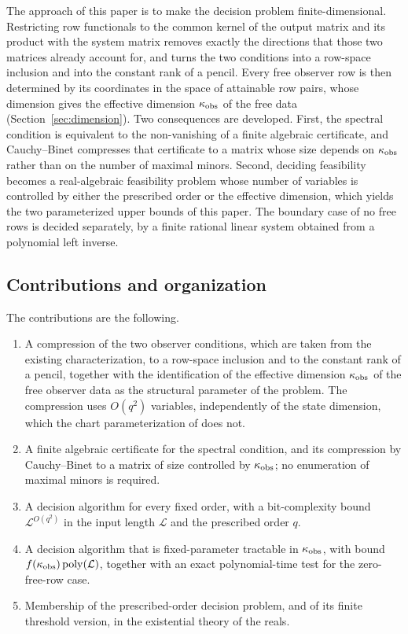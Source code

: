 \documentclass[journal]{IEEEtran}
\theoremstyle{plainn}
\theoremstyle{remark}
\begin{document}
The approach of this paper is to make the decision problem finite-dimensional. Restricting
row functionals to the common kernel of the output matrix and its product with the system
matrix removes exactly the directions that those two matrices already account for, and
turns the two conditions into a row-space inclusion and into the constant rank of a
pencil. Every free observer row is then determined by its coordinates in the space of
attainable row pairs, whose dimension gives the effective dimension $\kappa_{\rm obs}$ of
the free data (Section~\ref{sec:dimension}). Two consequences are developed. First, the
spectral condition is equivalent to the non-vanishing of a finite algebraic certificate,
and Cauchy--Binet compresses that certificate to a matrix whose size depends on
$\kappa_{\rm obs}$ rather than on the number of maximal minors. Second, deciding
feasibility becomes a real-algebraic feasibility problem whose number of variables is
controlled by either the prescribed order or the effective dimension, which yields the two
parameterized upper bounds of this paper. The boundary case of no free rows is decided
separately, by a finite rational linear system obtained from a polynomial left inverse.

\subsection{Contributions and organization}\label{sec:contrib}

The contributions are the following.

\begin{enumerate}
\item A compression of the two observer conditions, which are taken from the existing
characterization, to a row-space inclusion and to the constant rank of a pencil, together
with the identification of the effective dimension $\kappa_{\rm obs}$ of the free observer
data as the structural parameter of the problem. The compression uses $O(q^2)$ variables,
independently of the state dimension, which the chart parameterization of
\cite{fer26b} does not.
\item A finite algebraic certificate for the spectral condition, and its compression by
Cauchy--Binet to a matrix of size controlled by $\kappa_{\rm obs}$; no enumeration of
maximal minors is required.
\item A decision algorithm for every fixed order, with a bit-complexity bound
$\mathcal L^{O(q^2)}$ in the input length $\mathcal L$ and the prescribed order $q$.
\item A decision algorithm that is fixed-parameter tractable in $\kappa_{\rm obs}$, with
bound $f(\kappa_{\rm obs})\operatorname{poly}(\mathcal L)$, together with an exact
polynomial-time test for the zero-free-row case.
\item Membership of the prescribed-order decision problem, and of its finite threshold
version, in the existential theory of the reals.
\end{enumerate}
\end{document}
